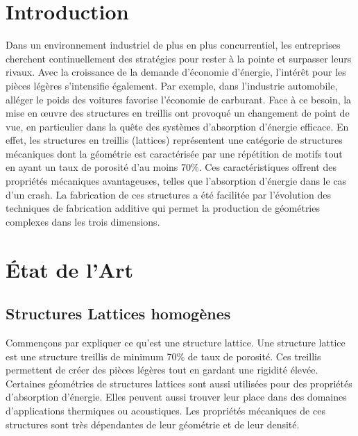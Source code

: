 \documentclass[a4paper]{article}
\begin{document}
	\newpage
	\renewcommand*\contentsname{Table des matières}
	\tableofcontents
	\newpage
	
	\newpage
	\renewcommand{\listfigurename}{Table des illustrations}
	\listoffigures
	\captionsetup{justification=centering}
	\newpage
	\renewcommand{\listtablename}{Liste des tableaux}
	\listoftables
	\captionsetup{justification=centering}
	\newpage
	
	\section{Introduction}
	\hspace{0.5cm}Dans un environnement industriel de plus en plus concurrentiel, les entreprises cherchent continuellement des stratégies pour rester à la pointe et surpasser leurs rivaux. Avec la croissance de la demande d’économie d’énergie, l'intérêt pour les pièces légères s'intensifie également. Par exemple, dans l'industrie automobile, alléger le poids des voitures favorise l'économie de carburant. Face à ce besoin, la mise en \oe uvre des structures en treillis ont provoqué un changement de point de vue, en particulier dans la quête des systèmes d'absorption d’énergie efficace. En effet, les structures en treillis (lattices) représentent une catégorie de structures mécaniques dont la géométrie est caractérisée par une répétition de motifs tout en ayant un taux de porosité d'au moins $70\%$. Ces caractéristiques offrent des propriétés mécaniques avantageuses, telles que l’absorption d’énergie dans le cas d’un crash. La fabrication de ces structures a été facilitée par l’évolution des techniques de fabrication additive qui permet la production de géométries complexes dans les trois dimensions.
	\newpage
	
	\section{État de l'Art}
	\subsection{Structures Lattices homogènes}
	\hspace{0.5cm}Commençons par expliquer ce qu’est une structure lattice. Une structure lattice est une structure treillis de minimum 70\% de taux de porosité. Ces treillis permettent de créer des pièces légères tout en gardant une rigidité élevée. Certaines géométries de structures lattices sont aussi utilisées pour des propriétés d’absorption d’énergie. Elles peuvent aussi trouver leur place dans des domaines d’applications thermiques ou acoustiques. Les propriétés mécaniques de ces structures sont très dépendantes de leur géométrie et de leur densité.\\
	
\end{document}
